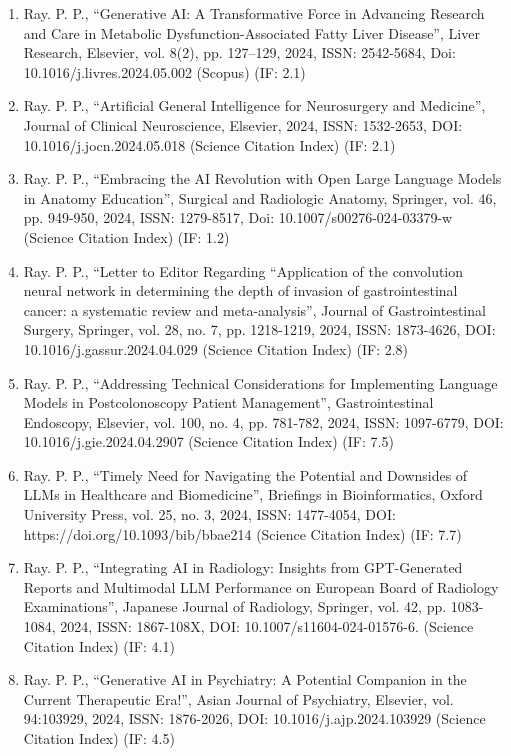 \documentclass[11pt,a4paper]{moderncv}
\begin{document}
\begin{adjustwidth}{6em}{0pt}
\begin{enumerate}
		\item Ray. P. P., “Generative AI: A Transformative Force in Advancing Research and Care in Metabolic Dysfunction-Associated Fatty Liver Disease”, Liver Research, Elsevier, vol. 8(2), pp. 127–129, 2024, ISSN: 2542-5684, Doi: 10.1016/j.livres.2024.05.002 (Scopus) (IF: 2.1)
		
		\item Ray. P. P., “Artificial General Intelligence for Neurosurgery and Medicine”, Journal of Clinical Neuroscience, Elsevier, 2024, ISSN: 1532-2653, DOI: 10.1016/j.jocn.2024.05.018 (Science Citation Index) (IF: 2.1)
		
		\item Ray. P. P., “Embracing the AI Revolution with Open Large Language Models in Anatomy Education”, Surgical and Radiologic Anatomy, Springer, vol. 46, pp. 949-950, 2024, ISSN: 1279-8517, Doi: 10.1007/s00276-024-03379-w (Science Citation Index) (IF: 1.2)
		
		\item Ray. P. P., “Letter to Editor Regarding “Application of the convolution neural network in determining the depth of invasion of gastrointestinal cancer: a systematic review and meta-analysis”, Journal of Gastrointestinal Surgery, Springer, vol. 28, no. 7, pp. 1218-1219, 2024, ISSN: 1873-4626, DOI: 10.1016/j.gassur.2024.04.029 (Science Citation Index) (IF: 2.8)
		
		\item Ray. P. P., “Addressing Technical Considerations for Implementing Language Models in Postcolonoscopy Patient Management”, Gastrointestinal Endoscopy, Elsevier, vol. 100, no. 4, pp. 781-782, 2024, ISSN: 1097-6779, DOI: 10.1016/j.gie.2024.04.2907 (Science Citation Index) (IF: 7.5)
		
		\item Ray. P. P., “Timely Need for Navigating the Potential and Downsides of LLMs in Healthcare and Biomedicine”, Briefings in Bioinformatics, Oxford University Press, vol. 25, no. 3, 2024, ISSN: 1477-4054, DOI: https://doi.org/10.1093/bib/bbae214 (Science Citation Index) (IF: 7.7)
		
		\item Ray. P. P., “Integrating AI in Radiology: Insights from GPT-Generated Reports and Multimodal LLM Performance on European Board of Radiology Examinations”, Japanese Journal of Radiology, Springer, vol. 42, pp. 1083-1084, 2024, ISSN: 1867-108X, DOI: 10.1007/s11604-024-01576-6. (Science Citation Index) (IF: 4.1)
		
		\item Ray. P. P., “Generative AI in Psychiatry: A Potential Companion in the Current Therapeutic Era!”, Asian Journal of Psychiatry, Elsevier, vol. 94:103929, 2024, ISSN: 1876-2026, DOI: 10.1016/j.ajp.2024.103929 (Science Citation Index) (IF: 4.5)
		

\end{enumerate}
\end{adjustwidth}
\end{document}

